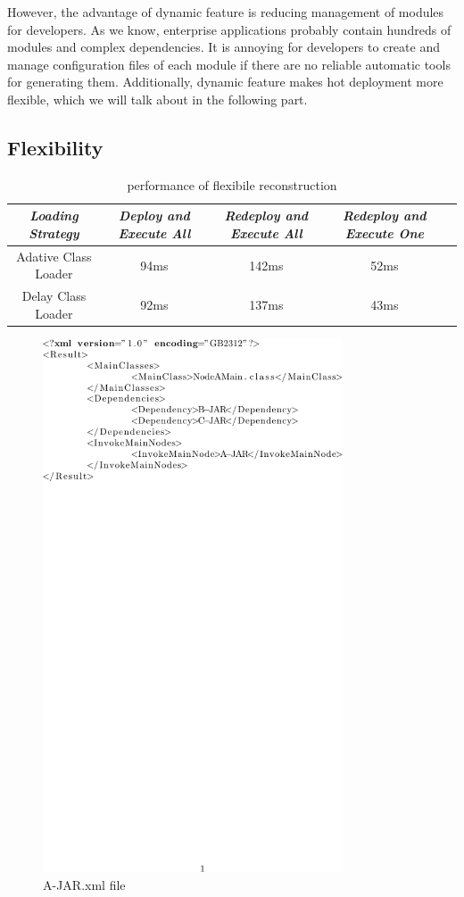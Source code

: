 \documentclass[conference]{IEEEtran}
\begin{document}
However, the advantage of dynamic feature is reducing management of modules for developers.
As we know, enterprise applications probably contain hundreds of modules and complex dependencies.
It is annoying for developers to create and manage configuration files of each module if there are no reliable automatic tools for generating them.
Additionally, dynamic feature makes hot deployment more flexible, which we will talk about in the following part.


\subsection{Flexibility}

\begin{table}
\centering
\caption{performance of flexibile reconstruction}
\label{tab:flexibility}
\begin{tabular}{|c|c|c|c|c|}
\hline
\emph{Loading Strategy}	& \emph{Deploy and Execute All}	& \emph{Redeploy and Execute All} & \emph{Redeploy and Execute One}\\
\hline
\hline
Adative Class Loader 	&	94ms				&	142ms				&	52ms\\
\hline
Delay Class Loader 	&	92ms				&	137ms				&	43ms\\
\hline
\end{tabular}
\end{table}

\begin{figure}[ht]
\centering
\includegraphics[width=3.5in]{xmlpicture.pdf}
\caption{A-JAR.xml file}
\label{fig:xml_pic}
\end{figure}
\end{document}
